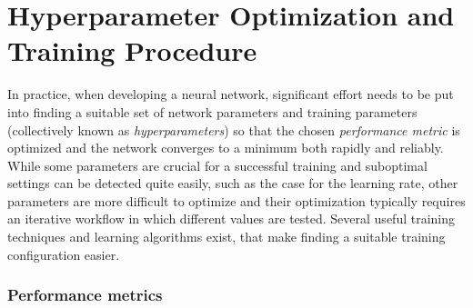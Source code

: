 \section{Hyperparameter Optimization and Training Procedure} 
\label{sec:hyperpar-opt}
In practice, when developing a neural network, significant effort needs to be put into finding a suitable set of network parameters and training parameters (collectively known as \emph{hyperparameters}) so that the chosen \emph{performance metric} is optimized and the network converges to a minimum both rapidly and reliably. 
While some parameters are crucial for a successful training and suboptimal settings can be detected quite easily, such as the case for the learning rate, other parameters are more difficult to optimize and their optimization typically requires an iterative workflow in which different values are tested. 
Several useful training techniques and learning algorithms exist, that make finding a suitable training configuration easier.

\subsubsection{Performance metrics}

